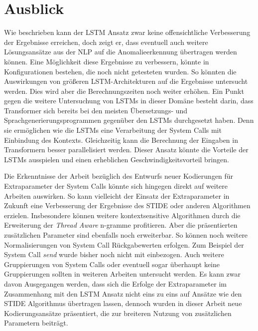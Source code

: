 \section{Ausblick}
Wie beschrieben kann der \ac{LSTM} Ansatz zwar keine offensichtliche Verbesserung der Ergebnisse erreichen, doch zeigt er, dass eventuell auch weitere Lösungsansätze aus der \ac{NLP} auf die Anomalieerkennung übertragen werden können.
Eine Möglichkeit diese Ergebnisse zu verbessern, könnte in Konfigurationen bestehen, die noch nicht getesteten wurden.
So könnten die Auswirkungen von größeren \ac{LSTM}-Architekturen auf die Ergebnisse untersucht werden.
Dies wird aber die Berechnungszeiten noch weiter erhöhen.
Ein Punkt gegen die weitere Untersuchung von \acp{LSTM} in dieser Domäne besteht darin, dass Transformer sich bereits bei den meisten Übersetzungs-  und Sprachgenerierungsprogrammen  gegenüber den \acp{LSTM} durchgesetzt haben. 
Denn sie ermöglichen wie die \acp{LSTM} eine Verarbeitung der System Calls mit Einbindung des Kontexts.
Gleichzeitig kann die Berechnung der Eingaben in Transformern besser parallelisiert werden.
Dieser Ansatz könnte die Vorteile der \acp{LSTM} ausspielen und einen erheblichen Geschwindigkeitsvorteil bringen.

Die Erkenntnisse der Arbeit bezüglich des Entwurfs neuer Kodierungen für Extraparameter der System Calls könnte sich hingegen direkt auf weitere Arbeiten auswirken.
So kann vielleicht der Einsatz der Extraparameter in Zukunft eine Verbesserung der Ergebnisse des \ac{STIDE} oder anderen Algorithmen erzielen.
Insbesondere können weitere kontextsensitive Algorithmen durch die Erweiterung der \textit{Thread Aware} n-gramme profitieren. 
Aber die präsentierten zusätzlichen Parameter sind ebenfalls noch erweiterbar.
So können noch weitere Normalisierungen von System Call Rückgabewerten erfolgen.
Zum Beispiel der System Call \textit{send} wurde bisher noch nicht mit einbezogen.
Auch weitere Gruppierungen von System Calls oder eventuell sogar überhaupt keine Gruppierungen sollten in weiteren Arbeiten untersucht werden.
Es kann zwar davon Ausgegangen werden, dass sich die Erfolge der Extraparameter im Zusammenhang mit den \ac{LSTM} Ansatz nicht eins zu eins auf Ansätze wie den \ac{STIDE} Algorithmus übertragen lassen, dennoch wurden in dieser Arbeit neue Kodierungsansätze präsentiert, die zur breiteren Nutzung von zusätzlichen Parametern beiträgt.

